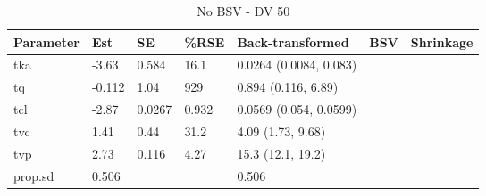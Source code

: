 \begin{table}
\centering\centering
\caption{No BSV - DV 50}
\centering
\fontsize{8}{10}\selectfont
\begin{tabular}[t]{lllllll}
\toprule
\textbf{Parameter} & \textbf{Est} & \textbf{SE} & \textbf{\%RSE} & \textbf{Back-transformed} & \textbf{BSV} & \textbf{Shrinkage}\\
\midrule
tka & -3.63 & 0.584 & 16.1 & 0.0264 (0.0084, 0.083) &  & \\
\midrule
tq & -0.112 & 1.04 & 929 & 0.894 (0.116, 6.89) &  & \\
\midrule
tcl & -2.87 & 0.0267 & 0.932 & 0.0569 (0.054, 0.0599) &  & \\
\midrule
tvc & 1.41 & 0.44 & 31.2 & 4.09 (1.73, 9.68) &  & \\
\midrule
tvp & 2.73 & 0.116 & 4.27 & 15.3 (12.1, 19.2) &  & \\
\midrule
prop.sd & 0.506 &  &  & 0.506 &  & \\
\bottomrule
\end{tabular}
\end{table}